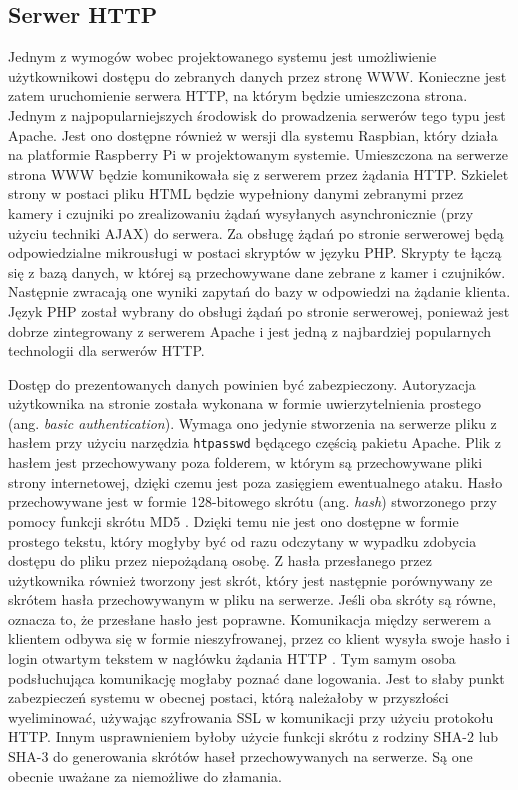 \documentclass[a4paper,11pt,twoside]{article}
\begin{document}
\subsection{Serwer HTTP}
Jednym z wymogów wobec projektowanego systemu jest umożliwienie użytkownikowi dostępu do zebranych danych przez stronę WWW. Konieczne jest zatem uruchomienie serwera HTTP, na którym będzie umieszczona strona. Jednym z najpopularniejszych środowisk do prowadzenia serwerów tego typu jest Apache. Jest ono dostępne również w wersji dla systemu Raspbian, który działa na platformie Raspberry Pi w projektowanym systemie. Umieszczona na serwerze strona WWW będzie komunikowała się z serwerem przez żądania HTTP. Szkielet strony w postaci pliku HTML będzie wypełniony danymi zebranymi przez kamery i czujniki po zrealizowaniu żądań wysyłanych asynchronicznie (przy użyciu techniki AJAX) do serwera. Za obsługę żądań po stronie serwerowej będą odpowiedzialne mikrousługi w postaci skryptów w języku PHP. Skrypty te łączą się z bazą danych, w której są przechowywane dane zebrane z kamer i czujników. Następnie zwracają one wyniki zapytań do bazy w odpowiedzi na żądanie klienta. Język PHP został wybrany do obsługi żądań po stronie serwerowej, ponieważ jest dobrze zintegrowany z serwerem Apache i jest jedną z najbardziej popularnych technologii dla serwerów HTTP.

Dostęp do prezentowanych danych powinien być zabezpieczony. Autoryzacja użytkownika na stronie została wykonana w formie uwierzytelnienia prostego (ang. \textit{basic authentication}). Wymaga ono jedynie stworzenia na serwerze pliku z hasłem przy użyciu narzędzia \texttt{htpasswd} będącego częścią pakietu Apache. Plik z hasłem jest przechowywany poza folderem, w którym są przechowywane pliki strony internetowej, dzięki czemu jest poza zasięgiem ewentualnego ataku. Hasło przechowywane jest w formie 128-bitowego skrótu (ang. \textit{hash}) stworzonego przy pomocy funkcji skrótu MD5 \cite{apache-password}. Dzięki temu nie jest ono dostępne  w formie prostego tekstu, który mogłyby być od razu odczytany w wypadku zdobycia dostępu do pliku przez niepożądaną osobę. Z hasła przesłanego przez użytkownika również tworzony jest skrót, który jest następnie porównywany ze skrótem hasła przechowywanym w pliku na serwerze. Jeśli oba skróty są równe, oznacza to, że przesłane hasło jest poprawne. Komunikacja między serwerem a klientem odbywa się w formie nieszyfrowanej, przez co klient wysyła swoje hasło i login otwartym tekstem w nagłówku żądania HTTP \cite{http-auth}. Tym samym osoba podsłuchująca komunikację mogłaby poznać dane logowania. Jest to słaby punkt zabezpieczeń systemu w obecnej postaci, którą należałoby w przyszłości wyeliminować, używając szyfrowania SSL w komunikacji przy użyciu protokołu HTTP. Innym usprawnieniem byłoby użycie funkcji skrótu z rodziny SHA-2 lub SHA-3 do generowania skrótów haseł przechowywanych na serwerze. Są one obecnie uważane za niemożliwe do złamania.
 
\end{document}
